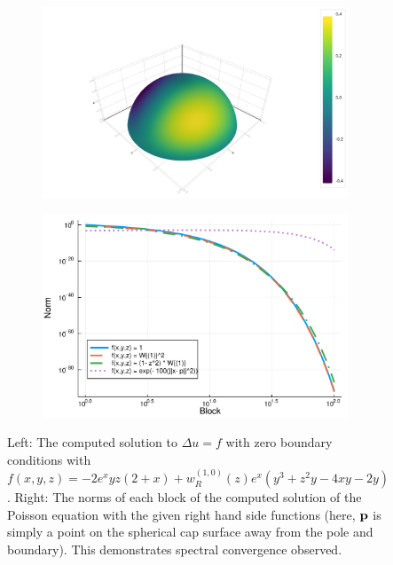 \documentclass[11pt, oneside]{article}   	%
\newcommand{\genjac}{R}
\newcommand{\genjacw}{w_\genjac}
\begin{document}
\begin{figure}[t]
	\begin{subfigure}{0.5\textwidth}
	\includegraphics[scale=0.25]{poisson-u=wyexpx-N=60}
	\centering
	\end{subfigure}
	\begin{subfigure}{0.5\textwidth}
	\centering
	\includegraphics[scale=0.3]{solutionblocknorms-poisson-N=100}
	\end{subfigure}
	\caption{Left: The computed solution to $\Delta u = f$ with zero boundary conditions with $f(x,y,z) = - 2 e^x y z (2+x) + \genjacw^{(1,0)}(z) e^x (y^3 + z^2 y - 4xy - 2y)$. Right: The norms of each block of the computed solution of the Poisson equation with the given right hand side functions (here, $\bf{p}$ is simply a point on the spherical cap surface away from the pole and boundary). This demonstrates spectral convergence observed.}
	\centering
	\label{fig:poisson}
\end{figure}
\end{document}
